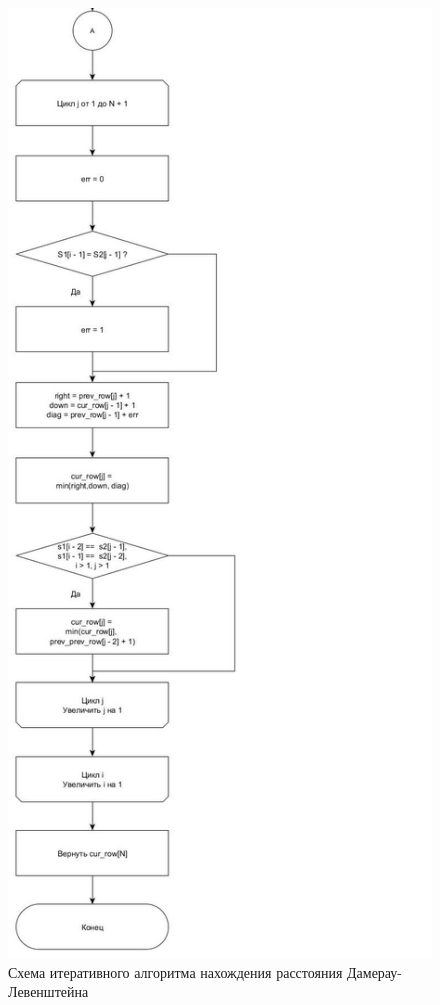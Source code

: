 \documentclass[12pt]{report}
\begin{document}
\begin{figure}[h]
	\centering
	\includegraphics[scale=0.6]{damer-lev_matr_12.jpg}
	\caption{Схема итеративного алгоритма нахождения расстояния Дамерау-Левенштейна}
	\label{fig:mpr}
\end{figure}
\clearpage
\end{document}
